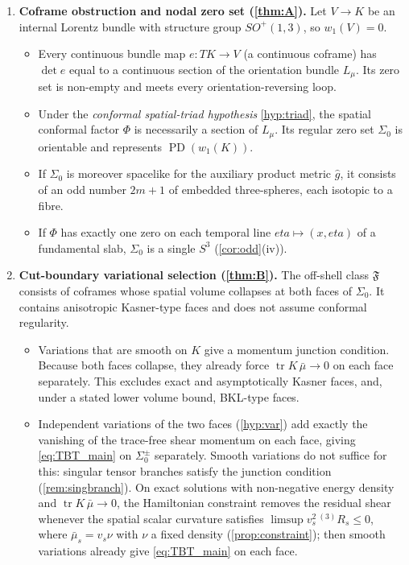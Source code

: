 \documentclass[11pt]{article}
\theoremstyle{canonmath}
\theoremstyle{canonpostulate}
\theoremstyle{canonproposition}
\theoremstyle{canonmath}
\theoremstyle{canonproposition}
\providecommand{\Lmu}{\mathcal{L}_\mu}
\providecommand{\Vb}{\mathcal{V}}
\providecommand{\PD}{\operatorname{PD}}
\providecommand{\Fcl}{\mathfrak{F}}
\providecommand{\Klein}{\mathcal{K}}
\def\mathcal#1{#1}%
\def\eta{eta}%
\begin{document}
\begin{enumerate}[label=\textbf{\Alph*.}]
\item \textbf{Coframe obstruction and nodal zero set (\cref{thm:A}).} Let $\Vb \to \Klein$ be an internal Lorentz bundle with structure group $SO^+(1,3)$, so $w_1(\Vb) = 0$.
  \begin{itemize}
  \item Every continuous bundle map $e: T\Klein \to \Vb$ (a continuous coframe) has $\det e$ equal to a continuous section of the orientation bundle $\Lmu$. Its zero set is non-empty and meets every orientation-reversing loop.
  \item Under the \emph{conformal spatial-triad hypothesis} \ref{hyp:triad}, the spatial conformal factor $\Phi$ is necessarily a section of $\Lmu$. Its regular zero set $\Sigma_0$ is orientable and represents $\PD(w_1(\Klein))$.
  \item If $\Sigma_0$ is moreover spacelike for the auxiliary product metric $\hat g$, it consists of an odd number $2m+1$ of embedded three-spheres, each isotopic to a fibre.
  \item If $\Phi$ has exactly one zero on each temporal line $\eta\mapsto(x,\eta)$ of a fundamental slab, $\Sigma_0$ is a single $S^3$ (\cref{cor:odd}(iv)).
  \end{itemize}
\item \textbf{Cut-boundary variational selection (\cref{thm:B}).} The off-shell class $\Fcl$ consists of coframes whose spatial volume collapses at both faces of $\Sigma_0$. It contains anisotropic Kasner-type faces and does not assume conformal regularity.
  \begin{itemize}
  \item Variations that are smooth on $\Klein$ give a momentum junction condition. Because both faces collapse, they already force $\operatorname{tr}K\,\bar\mu\to0$ on each face separately. This excludes exact and asymptotically Kasner faces, and, under a stated lower volume bound, BKL-type faces.
  \item Independent variations of the two faces (\ref{hyp:var}) add exactly the vanishing of the trace-free shear momentum on each face, giving \eqref{eq:TBT_main} on $\Sigma_0^\pm$ separately. Smooth variations do not suffice for this: singular tensor branches satisfy the junction condition (\cref{rem:singbranch}). On exact solutions with non-negative energy density and $\operatorname{tr}K\,\bar\mu\to0$, the Hamiltonian constraint removes the residual shear whenever the spatial scalar curvature satisfies $\limsup v_s^2\,{}^{(3)}\!R_s\le0$, where $\bar\mu_s = v_s\nu$ with $\nu$ a fixed density (\cref{prop:constraint}); then smooth variations already give \eqref{eq:TBT_main} on each face.

\end{itemize}
\end{enumerate}
\end{document}
